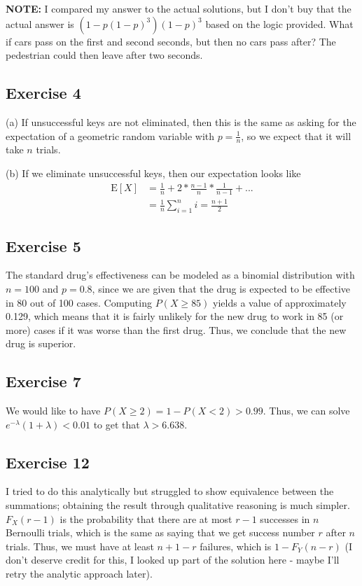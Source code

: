 \textbf{NOTE:} I compared my answer to the actual solutions, but I don't buy that the actual
answer is $(1 - p (1 - p)^3) (1 - p)^3$ based on the logic provided. What if cars pass on the first and second
seconds, but then no cars pass after? The pedestrian could then leave after two seconds.

\subsection{Exercise 4}
(a) If unsuccessful keys are not eliminated, then this is the same as asking for the expectation of a 
geometric random variable with $p = \frac{1}{n}$, so we expect that it will take $n$ trials.

(b) If we eliminate unsuccessful keys, then our expectation looks like  
\begin{align*}
        \mathrm{E} [X] &= \frac{1}{n} + 2 * \frac{n - 1}{n} * \frac{1}{n - 1} + ... \\
                       &= \frac{1}{n} \sum_{i = 1}^n i = \frac{n + 1}{2}
\end{align*}

\subsection{Exercise 5}
The standard drug's effectiveness can be modeled as a binomial distribution with $n = 100$ and $p = 0.8$, since
we are given that the drug is expected to be effective in 80 out of 100 cases. Computing $P(X \geq 85)$ yields
a value of approximately 0.129, which means that it is fairly unlikely for the new drug to work in 85
(or more) cases if it was worse than the first drug. Thus, we conclude that the new drug is superior.

\subsection{Exercise 7}
We would like to have $P(X \geq 2) = 1 - P(X < 2) > 0.99$. Thus, we can solve 
$e^{-\lambda} (1 + \lambda) < 0.01$ to get that $\lambda > 6.638$.

\subsection{Exercise 12}
I tried to do this analytically but struggled to show equivalence between the summations; obtaining the result
through qualitative reasoning is much simpler. $F_X(r - 1)$ is the probability that there are at most $r - 1$
successes in $n$ Bernoulli trials, which is the same as saying that we get success number $r$ after $n$ trials.
Thus, we must have at least $n + 1 - r$ failures, which is $1 - F_Y(n - r)$ (I don't deserve credit for this,
I looked up part of the solution here - maybe I'll retry the analytic approach later).


